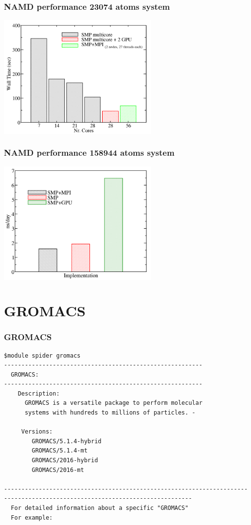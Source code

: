 \begin{frame}
	\frametitle{NAMD performance 23074 atoms system}
        \begin{center}
		\includegraphics[width=8cm]{images/profiling_namd.png}
        \end{center}
\end{frame}


\begin{frame}
	\frametitle{NAMD performance 158944 atoms system}
        \begin{center}
		\includegraphics[width=8cm]{images/profiling_namd2.png}
        \end{center}
\end{frame}



\section{GROMACS}

\begin{frame}[fragile]
	\frametitle{GROMACS}
{\small 
        \begin{verbatim}             
$module spider gromacs
---------------------------------------------------------
  GROMACS:
---------------------------------------------------------
    Description:
      GROMACS is a versatile package to perform molecular 
      systems with hundreds to millions of particles. - 

     Versions:
        GROMACS/5.1.4-hybrid
        GROMACS/5.1.4-mt
        GROMACS/2016-hybrid
        GROMACS/2016-mt

----------------------------------------------------------------------------------------------------------------------------
  For detailed information about a specific "GROMACS" 
  For example:

        \end{verbatim}
}
\end{frame}


